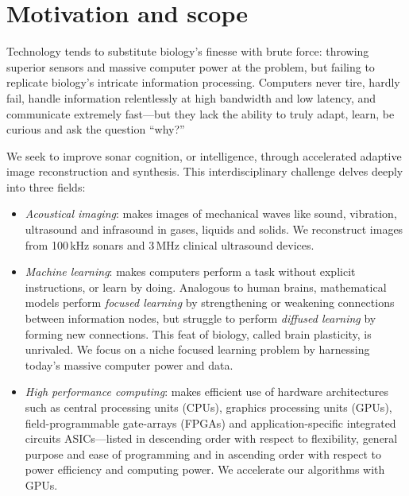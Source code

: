 \section{Motivation and scope}

Technology tends to substitute biology's finesse with brute force: throwing superior sensors and massive computer power at the problem, but failing to replicate biology's intricate information processing. Computers never tire, hardly fail, handle information relentlessly at high bandwidth and low latency, and communicate extremely fast---but they lack the ability to truly adapt, learn, be curious and ask the question ``why?''


We seek to improve sonar cognition, or intelligence, through accelerated adaptive image reconstruction and synthesis. This  interdisciplinary challenge delves deeply into three fields:%
%
\begin{itemize}
%
\item \emph{Acoustical imaging}: makes images of mechanical waves like sound, vibration, ultrasound and infrasound in gases, liquids and solids. We reconstruct images from 100\,kHz sonars and 3\,MHz clinical ultrasound devices. 
%
\item \emph{Machine learning}: makes computers perform a task without explicit instructions, or learn by doing. Analogous to human brains, mathematical models perform \emph{focused learning} by strengthening or weakening connections between information nodes, but struggle to perform \emph{diffused learning} by forming new connections. This feat of biology, called brain plasticity, is unrivaled. We focus on a niche focused learning problem by harnessing today's massive computer power and data.
%
\item \emph{High performance computing}: makes efficient use of hardware architectures such as central processing units (CPUs), graphics processing units (GPUs), field-programmable gate-arrays (FPGAs) and application-specific integrated circuits ASICs---listed in descending order with respect to flexibility, general purpose and ease of programming and in ascending order with respect to power efficiency and computing power. We accelerate our algorithms with GPUs.
\end{itemize}


